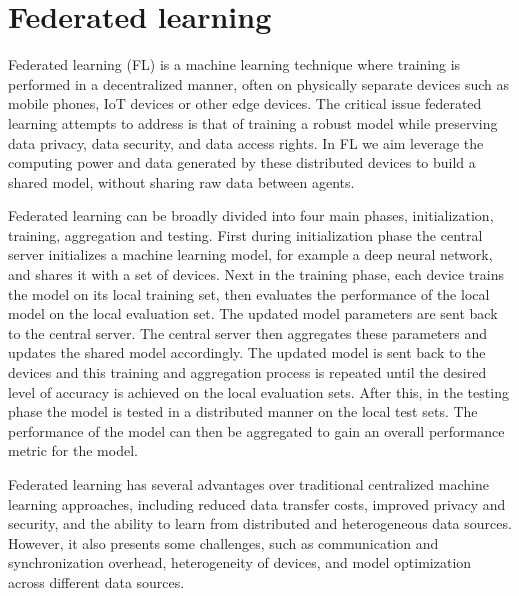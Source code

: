 \section{Federated learning}


Federated learning (FL) \cite{FederatedLearning} is a machine learning technique where training is performed in a decentralized manner, often on physically separate devices such as mobile phones, IoT devices or other edge devices. 
The critical issue federated learning attempts to address is that of training a robust model while preserving data privacy, data security, and data access rights.
In FL we aim leverage the computing power and data generated by these distributed devices to build a shared model, without sharing raw data between agents.

Federated learning can be broadly divided into four main phases, initialization, training, aggregation and testing. 
First during initialization phase the central server initializes a machine learning model, for example a deep neural network, and shares it with a set of devices. 
Next in the training phase, each device trains the model on its local training set, then evaluates the performance of the local model on the local evaluation set. 
The updated model parameters are sent back to the central server. 
The central server then aggregates these parameters and updates the shared model accordingly.
The updated model is sent back to the devices and this training and aggregation process is repeated until the desired level of accuracy is achieved on the local evaluation sets.
After this, in the testing phase the model is tested in a distributed manner on the local test sets. The performance of the model can then be aggregated to gain an overall performance metric for the model.


Federated learning has several advantages over traditional centralized machine learning approaches, including reduced data transfer costs, improved privacy and security, and the ability to learn from distributed and heterogeneous data sources. However, it also presents some challenges, such as communication and synchronization overhead, heterogeneity of devices, and model optimization across different data sources.

